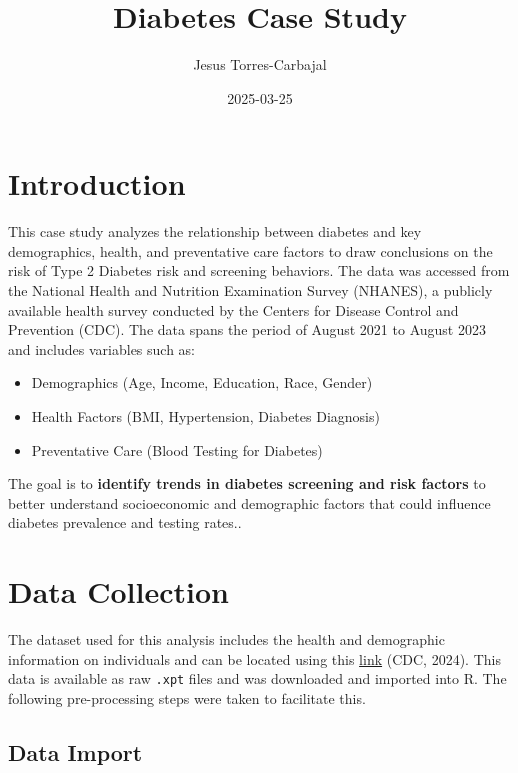 \documentclass[
]{article}
\title{Diabetes Case Study}
\author{Jesus Torres-Carbajal}
\date{2025-03-25}
\begin{document}
\maketitle

{
\setcounter{tocdepth}{2}
\tableofcontents
}
\section{Introduction}\label{introduction}

This case study analyzes the relationship between diabetes and key
demographics, health, and preventative care factors to draw conclusions
on the risk of Type 2 Diabetes risk and screening behaviors. The data
was accessed from the National Health and Nutrition Examination Survey
(NHANES), a publicly available health survey conducted by the Centers
for Disease Control and Prevention (CDC). The data spans the period of
August 2021 to August 2023 and includes variables such as:

\begin{itemize}
\item
  Demographics (Age, Income, Education, Race, Gender)
\item
  Health Factors (BMI, Hypertension, Diabetes Diagnosis)
\item
  Preventative Care (Blood Testing for Diabetes)
\end{itemize}

The goal is to \textbf{identify trends in diabetes screening and risk
factors} to better understand socioeconomic and demographic factors that
could influence diabetes prevalence and testing rates..

\section{Data Collection}\label{data-collection}

The dataset used for this analysis includes the health and demographic
information on individuals and can be located using this
\href{https://wwwn.cdc.gov/nchs/nhanes/continuousnhanes/default.aspx?Cycle=2021-2023}{link}
(CDC, 2024). This data is available as raw \texttt{.xpt} files and was
downloaded and imported into R. The following pre-processing steps were
taken to facilitate this.

\subsection{Data Import}\label{data-import}
\end{document}
